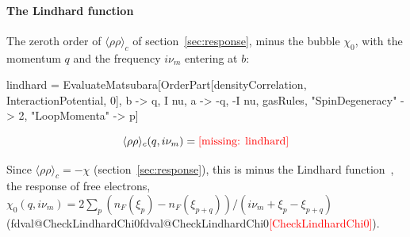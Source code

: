 \documentclass[11pt,a4paper]{article}
\makeatletter
\newcommand{\formula}[1]{\IfFileExists{figures/formula_#1.tex}{}{\text{\textcolor{red}{[missing: \detokenize{#1}]}}}}
\newcommand{\val}[1]{\ifcsname fdval@#1\endcsname\csname fdval@#1\endcsname\else\textcolor{red}{[#1]}\fi}
\makeatother
\begin{document}
\paragraph{The Lindhard function} The zeroth order of $\langle\rho\rho\rangle_c$ of section~\ref{sec:response}, minus the bubble $\chi_0$, with the momentum $q$ and the frequency
$i\nu_m$ entering at $b$:
\begin{code}
lindhard = EvaluateMatsubara[OrderPart[densityCorrelation, InteractionPotential, 0],
    {b -> {q, I nu}, a -> {-q, -I nu}}, gasRules, "SpinDegeneracy" -> 2,
    "LoopMomenta" -> {p}]
\end{code}
\begin{outputbox}
\vspace{-6pt}
\[
\langle\rho\rho\rangle_c(q,i\nu_m)=\formula{lindhard}
\]
\end{outputbox}
Since $\langle\rho\rho\rangle_c=-\chi$ (section~\ref{sec:response}), this is minus the Lindhard
function~\cite{Lindhard1954}, the response of free electrons,
$\chi_0(q,i\nu_m)=2\sum_p(n_F(\xi_p)-n_F(\xi_{p+q}))/(i\nu_m+\xi_p-\xi_{p+q})$ (\val{CheckLindhardChi0}).
\end{document}
